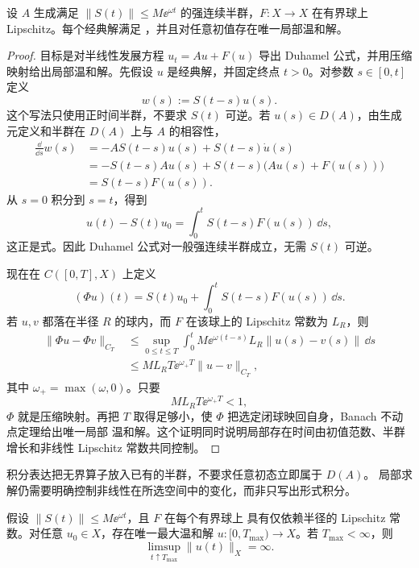 \begin{proposition}
设 $A$ 生成满足 $\|S(t)\|\le M\ee^{\omega t}$ 的强连续半群，$F:X\to X$ 在有界球上 Lipschitz。每个经典解满足 ，并且对任意初值存在唯一局部温和解。
\end{proposition}
\begin{proof}
目标是对半线性发展方程 $u_t=Au+F(u)$ 导出 Duhamel 公式，并用压缩映射给出局部温和解。先假设 $u$ 是经典解，并固定终点 $t>0$。对参数 $s\in[0,t]$ 定义
\[
w(s):=S(t-s)u(s).
\]
这个写法只使用正时间半群，不要求 $S(t)$ 可逆。若 $u(s)\in D(A)$，由生成元定义和半群在 $D(A)$ 上与 $A$ 的相容性，
\[
\begin{aligned}
\frac{\dd}{\dd s}w(s)
&=-AS(t-s)u(s)+S(t-s)\dot u(s)\\
&=-S(t-s)Au(s)+S(t-s)\bigl(Au(s)+F(u(s))\bigr)\\
&=S(t-s)F(u(s)).
\end{aligned}
\]
从 $s=0$ 积分到 $s=t$，得到
\[
u(t)-S(t)u_0
=\int_0^tS(t-s)F(u(s))\,\dd s,
\]
这正是式。因此 Duhamel 公式对一般强连续半群成立，无需 $S(t)$ 可逆。

现在在 $C([0,T],X)$ 上定义
\[
(\Phi u)(t)
=S(t)u_0+
\int_0^tS(t-s)F(u(s))\,\dd s.
\]
若 $u,v$ 都落在半径 $R$ 的球内，而 $F$ 在该球上的 Lipschitz 常数为 $L_R$，则
\[
\begin{aligned}
\|\Phi u-\Phi v\|_{C_T}
&\le
\sup_{0\le t\le T}
\int_0^t
M\ee^{\omega(t-s)}
L_R\|u(s)-v(s)\|\,\dd s\\
&\le
ML_R T\ee^{\omega_+T}
\|u-v\|_{C_T},
\end{aligned}
\]
其中 $\omega_+=\max(\omega,0)$。只要
\[
ML_RT\ee^{\omega_+T}<1,
\]
$\Phi$ 就是压缩映射。再把 $T$ 取得足够小，使 $\Phi$ 把选定闭球映回自身，Banach 不动点定理给出唯一局部 温和解。这个证明同时说明局部存在时间由初值范数、半群增长和非线性 Lipschitz 常数共同控制。
\end{proof}


积分表达把无界算子放入已有的半群，不要求任意初态立即属于 $D(A)$。
局部求解仍需要明确控制非线性在所选空间中的变化，而非只写出形式积分。

\begin{theorem}
假设 $\|S(t)\|\le M\ee^{\omega t}$，且 $F$ 在每个有界球上
具有仅依赖半径的 Lipschitz 常数。对任意 $u_0\in X$，存在唯一最大温和解
$u:[0,T_{\max})\to X$。若 $T_{\max}<\infty$，则
\begin{equation}
\limsup_{t\uparrow T_{\max}}\|u(t)\|_X=\infty.
\label{eq:semilinear-blowup-alternative}
\end{equation}
\end{theorem}

